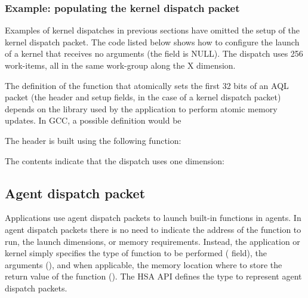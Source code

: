 \documentclass[final,oneside]{book}
\begin{document}
\subsubsection{Example: populating the kernel dispatch packet}
Examples of kernel dispatches in previous sections have omitted the setup of the
kernel dispatch packet. The code listed below shows how to configure the launch
of a kernel that receives no arguments (the
 field is NULL). The
dispatch uses 256 work-items, all in the same work-group along the X dimension.


The definition of the function that atomically sets the first 32 bits of an AQL
packet (the header and setup fields, in the case of a kernel dispatch packet)
depends on the library used by the application to perform atomic memory
updates. In GCC, a possible definition would be


The header is built using the following function:


The  contents indicate that the
dispatch uses one dimension:


\subsection{Agent dispatch packet}\label{agent-packet}

Applications use agent dispatch packets to launch built-in functions in
agents. In agent dispatch packets there is no need to indicate the address of
the function to run, the launch dimensions, or memory requirements. Instead, the
application or kernel simply specifies the type of function to be performed
( field), the arguments
(), and when applicable, the memory
location where to store the return value of the function
(). The HSA API defines the
type  to represent agent dispatch packets.
\end{document}
